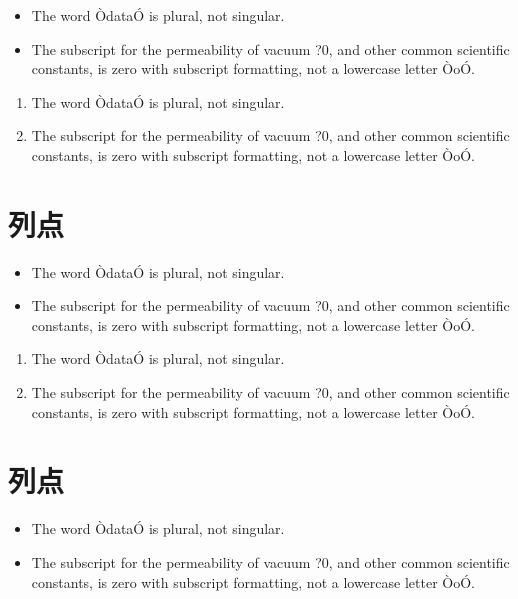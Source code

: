\documentclass[letterpaper, 10 pt, conference]{ieeeconf}
\begin{document}
\begin{itemize}
\item The word ÒdataÓ is plural, not singular.
\item The subscript for the permeability of vacuum ?0, and other common scientific constants, is zero with subscript formatting, not a lowercase letter ÒoÓ.
\end{itemize}

\begin{enumerate}
\item The word ÒdataÓ is plural, not singular.
\item The subscript for the permeability of vacuum ?0, and other common scientific constants, is zero with subscript formatting, not a lowercase letter ÒoÓ.
\end{enumerate}


\section{列点}

\begin{itemize}
\item The word ÒdataÓ is plural, not singular.
\item The subscript for the permeability of vacuum ?0, and other common scientific constants, is zero with subscript formatting, not a lowercase letter ÒoÓ.
\end{itemize}

\begin{enumerate}
\item The word ÒdataÓ is plural, not singular.
\item The subscript for the permeability of vacuum ?0, and other common scientific constants, is zero with subscript formatting, not a lowercase letter ÒoÓ.
\end{enumerate}


\section{列点}

\begin{itemize}
\item The word ÒdataÓ is plural, not singular.
\item The subscript for the permeability of vacuum ?0, and other common scientific constants, is zero with subscript formatting, not a lowercase letter ÒoÓ.
\end{itemize}
\end{document}
